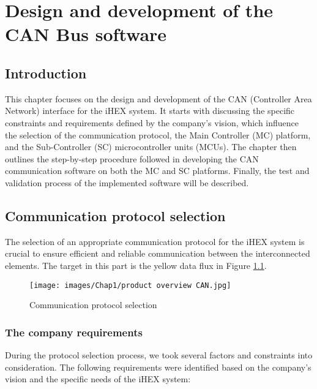 \chapter{Design and development of the CAN Bus software}

\renewcommand{\chaptername}{Chapter}

\section*{Introduction}
This chapter focuses on the design and development of the CAN (Controller Area Network) interface for the iHEX system. 
It starts with discussing the specific constraints and requirements defined by the company's vision, which influence the selection of the communication protocol, the Main Controller (MC) platform, and the Sub-Controller (SC) microcontroller units (MCUs). 
The chapter then outlines the step-by-step procedure followed in developing the CAN communication software on both the MC and SC platforms. 
Finally, the test and validation process of the implemented software will be described.

\section{Communication protocol selection}

The selection of an appropriate communication protocol for the iHEX system is crucial to ensure efficient and reliable communication between the interconnected elements. The target in this part is the yellow data flux in Figure \ref{comm selection}.

\begin{figure}[H]
\begin{center}
\texttt{[image: images/Chap1/product overview CAN.jpg]}\\
\caption{Communication protocol selection}
\label{comm selection}
\end{center}
\end{figure} 


\subsection{The company requirements}
During the protocol selection process, we took several factors and constraints into consideration. The following requirements were identified based on the company's vision and the specific needs of the iHEX system:

